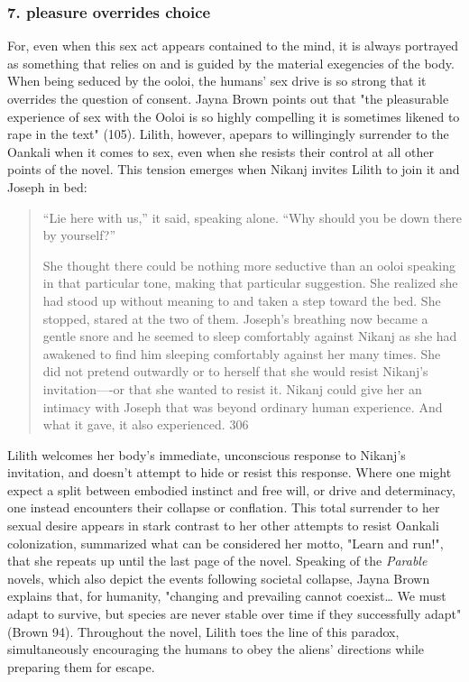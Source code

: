 \documentclass[11pt]{article}
\begin{document}
\subsubsection{7. pleasure overrides choice}
\label{sec:orgb649bcf}
For, even when this sex act appears contained to the mind, it is
always portrayed as something that relies on and is guided by the
material exegencies of the body. When being seduced by the ooloi, the
humans' sex drive is so strong that it overrides the question of
consent. Jayna Brown points out that "the pleasurable experience of
sex with the Ooloi is so highly compelling it is sometimes likened to
rape in the text" (105). Lilith, however, apepars to willingingly
surrender to the Oankali when it comes to sex, even when she resists
their control at all other points of the novel. This tension emerges
when Nikanj invites Lilith to join it and Joseph in bed:
\begin{quote}
“Lie here with us,” it said, speaking alone. “Why should you be down
there by yourself?”

She thought there could be nothing more seductive than an ooloi
speaking in that particular tone, making that particular
suggestion. She realized she had stood up without meaning to and taken
a step toward the bed. She stopped, stared at the two of
them. Joseph’s breathing now became a gentle snore and he seemed to
sleep comfortably against Nikanj as she had awakened to find him
sleeping comfortably against her many times. She did not pretend
outwardly or to herself that she would resist Nikanj’s invitation—-or
that she wanted to resist it. Nikanj could give her an intimacy with
Joseph that was beyond ordinary human experience. And what it gave, it
also experienced. 306
\end{quote}
Lilith welcomes her body's immediate, unconscious response to Nikanj's
invitation, and doesn't attempt to hide or resist this response. Where
one might expect a split between embodied instinct and free will, or
drive and determinacy, one instead encounters their collapse or
conflation. This total surrender to her sexual desire appears in stark
contrast to her other attempts to resist Oankali colonization,
summarized what can be considered her motto, "Learn and run!", that
she repeats up until the last page of the novel. Speaking of the
\emph{Parable} novels, which also depict the events following societal
collapse, Jayna Brown explains that, for humanity, "changing and
prevailing cannot coexist\ldots{} We must adapt to survive, but species are
never stable over time if they successfully adapt" (Brown
94). Throughout the novel, Lilith toes the line of this paradox,
simultaneously encouraging the humans to obey the aliens' directions
while preparing them for escape.
\end{document}
